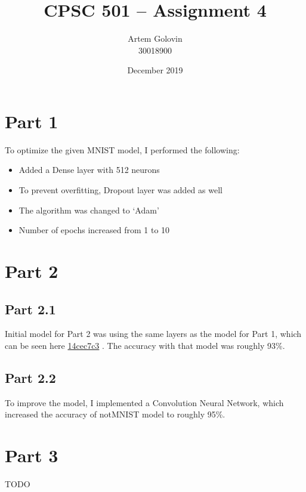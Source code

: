 \documentclass{article}
\title{CPSC 501 -- Assignment 4}
\author{Artem Golovin \\ 30018900}
\date{December 2019}
\newcommand{\gh}[1]{%
  \href{https://github.com/awave1/cpsc501-tensorflow/commit/#1}{#1}%
}
\begin{document}
\maketitle

\section*{Part 1}

To optimize the given MNIST model, I performed the following:

\begin{itemize}
  \item Added a Dense layer with 512 neurons
  \item To prevent overfitting, Dropout layer was added as well
  \item The algorithm was changed to `Adam'
  \item Number of epochs increased from 1 to 10
\end{itemize}


\section*{Part 2}

\subsection*{Part 2.1}

Initial model for Part 2 was using the same layers as the model for Part 1, which can be seen here \gh{14cec7c3}. The accuracy with that model was roughly 93\%.

\subsection*{Part 2.2}

To improve the model, I implemented a Convolution Neural Network, which increased the accuracy of notMNIST model to roughly 95\%.

\section*{Part 3}

TODO
\end{document}
